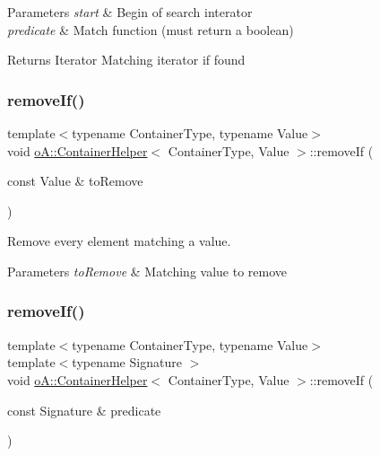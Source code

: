 \begin{DoxyParams}{Parameters}
{\em start} & Begin of search interator \\
\hline
{\em predicate} & Match function (must return a boolean) \\
\hline
\end{DoxyParams}
\begin{DoxyReturn}{Returns}
Iterator Matching iterator if found 
\end{DoxyReturn}
\mbox{\label{classo_a_1_1_container_helper_a9ed895ce074880a44d19c0b37da02c83}} 
\subsubsection{\texorpdfstring{remove\+If()}{removeIf()}\hspace{0.1cm}{\footnotesize\ttfamily [1/2]}}
{\footnotesize\ttfamily template$<$typename Container\+Type, typename Value$>$ \\
void \mbox{\hyperlink{classo_a_1_1_container_helper}{o\+A\+::\+Container\+Helper}}$<$ Container\+Type, Value $>$\+::remove\+If (\begin{DoxyParamCaption}\item[{const Value \&}]{to\+Remove }\end{DoxyParamCaption})\hspace{0.3cm}{\ttfamily [inline]}}



Remove every element matching a value. 


\begin{DoxyParams}{Parameters}
{\em to\+Remove} & Matching value to remove \\
\hline
\end{DoxyParams}
\mbox{\label{classo_a_1_1_container_helper_abeca65c6bc826fe9ad640599a8912dc3}} 
\subsubsection{\texorpdfstring{remove\+If()}{removeIf()}\hspace{0.1cm}{\footnotesize\ttfamily [2/2]}}
{\footnotesize\ttfamily template$<$typename Container\+Type, typename Value$>$ \\
template$<$typename Signature $>$ \\
void \mbox{\hyperlink{classo_a_1_1_container_helper}{o\+A\+::\+Container\+Helper}}$<$ Container\+Type, Value $>$\+::remove\+If (\begin{DoxyParamCaption}\item[{const Signature \&}]{predicate }\end{DoxyParamCaption})\hspace{0.3cm}{\ttfamily [inline]}}



